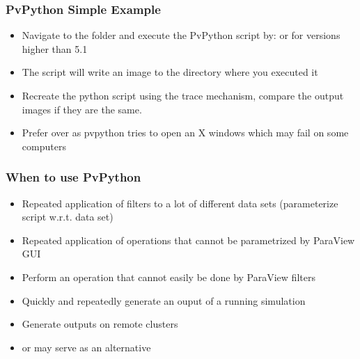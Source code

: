 \begin{frame}

  \frametitle{PvPython Simple Example}

  \begin{itemize}

      \item Navigate to the folder and execute the PvPython script by:  or for versions higher than 5.1

      \item The script will write an image  to the directory where you executed it 
      \item Recreate the python script using the trace mechanism, compare the output images if they are the same.

      \item Prefer  over  as pvpython tries to open an X windows which may fail on some computers    
  \end{itemize}

\end{frame}

\begin{frame}

  \frametitle{When to use PvPython}

  \begin{itemize}

    \item Repeated application of filters to a lot of different data sets (parameterize script w.r.t. data set) 

    \item Repeated application of operations that cannot be parametrized by ParaView GUI

    \item Perform an operation that cannot easily be done by ParaView filters 

    \item Quickly and repeatedly generate an ouput of a running simulation 

    \item Generate outputs on remote clusters 

    \item {} or  may serve as an alternative 

  \end{itemize}

\end{frame}



